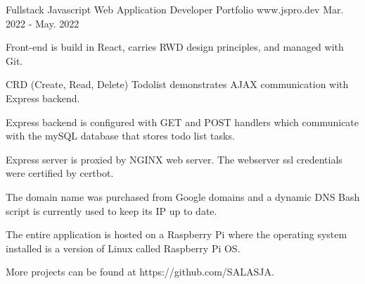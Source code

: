 

\begin{cventries}

  \cventry
    {Fullstack Javascript Web Application Developer Portfolio} %
    {www.jspro.dev} %
    {} %
    {Mar. 2022 - May. 2022} %
    {
      \begin{cvitems} %
        \item {Front-end is build in React, carries RWD design principles, and managed with Git.}
        \item {CRD (Create, Read, Delete) Todolist demonstrates AJAX communication with Express backend.}
        \item {Express backend is configured with GET and POST handlers which communicate with the mySQL database that stores todo list tasks.}
        \item {Express server is proxied by NGINX web server. The webserver ssl credentials were certified by certbot.}
        \item{The domain name was purchased from Google domains and a dynamic DNS Bash script is currently used to keep its IP up to date.}
        \item{The entire application is hosted on a Raspberry Pi where the operating system installed is a version of Linux called Raspberry Pi OS}.
        \item{More projects can be found at https://github.com/SALASJA.}
      \end{cvitems}
    }


\end{cventries}
